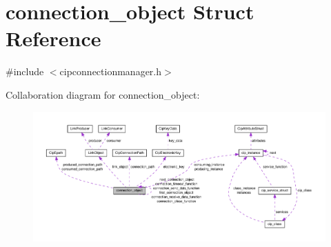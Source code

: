 \hypertarget{structconnection__object}{\section{connection\-\_\-object \-Struct \-Reference}
\label{d1/d48/structconnection__object}
}


{\ttfamily \#include $<$cipconnectionmanager.\-h$>$}



\-Collaboration diagram for connection\-\_\-object\-:
\nopagebreak
\begin{figure}[H]
\begin{center}
\leavevmode
\includegraphics[width=350pt]{de/db3/structconnection__object__coll__graph}
\end{center}
\end{figure}
